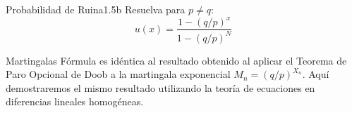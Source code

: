 \documentclass[10pt,a4paper]{article}
\begin{document}
\newpage

\begin{ejercicio}{Probabilidad de Ruina}{1.5b}
    Resuelva para $p \neq q$:
    \[ u(x) = \frac{1 - (q/p)^x}{1 - (q/p)^N} \]
\end{ejercicio}

\vspace{2mm}

\begin{nota}{Martingalas}
    Fórmula es idéntica al resultado obtenido al aplicar el Teorema de Paro Opcional de Doob a la martingala exponencial $M_n = (q/p)^{X_n}$. 
    Aquí demostraremos el mismo resultado utilizando la teoría de ecuaciones en diferencias lineales homogéneas.
\end{nota}

\vspace{2mm}
\end{document}
